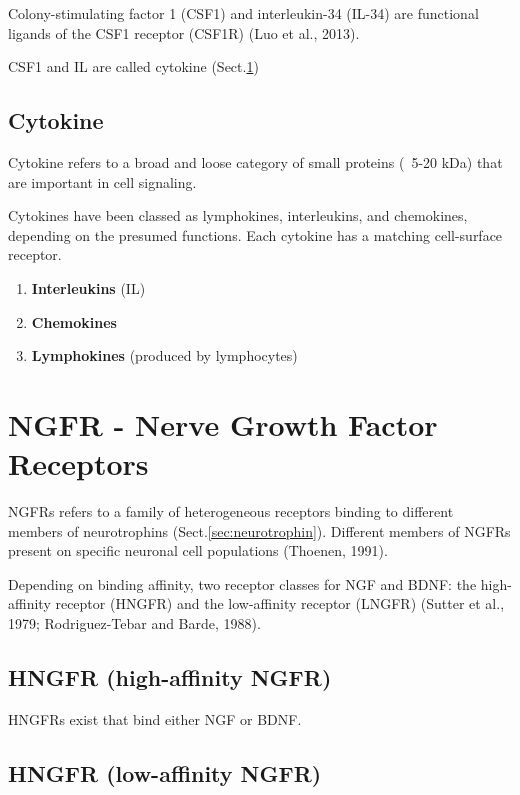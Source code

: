 Colony-stimulating factor 1 (CSF1) and interleukin-34 (IL-34) are functional
ligands of the CSF1 receptor (CSF1R) (Luo et al., 2013).

CSF1 and IL are called cytokine (Sect.\ref{sec:cytokine}) 



\section{Cytokine}
\label{sec:cytokine}

Cytokine refers to a broad and loose category of small proteins (~5-20 kDa) that
are important in cell signaling.

Cytokines have been classed as lymphokines, interleukins, and chemokines,
depending on the presumed functions. Each cytokine has a matching cell-surface
receptor.
\begin{enumerate}
  \item {\bf Interleukins} (IL)
  
  
  \item {\bf Chemokines}
  
  \item {\bf Lymphokines} (produced by lymphocytes)
\end{enumerate}


\chapter{NGFR - Nerve Growth Factor Receptors}
\label{sec:NGFR}

NGFRs refers to a family of heterogeneous receptors binding to different members
of neurotrophins (Sect.\ref{sec:neurotrophin}).
Different members of NGFRs present on specific neuronal cell populations
(Thoenen, 1991).

Depending on binding affinity, two receptor classes for NGF and BDNF: the
high-affinity receptor (HNGFR) and the low-affinity receptor (LNGFR) (Sutter et
al., 1979; Rodriguez-Tebar and Barde, 1988).

\section{HNGFR (high-affinity NGFR)}
\label{sec:NGFR-high-affinity}

HNGFRs exist that bind either NGF
or BDNF.


\section{HNGFR (low-affinity NGFR)}
\label{sec:NGFR-low-affinity}

